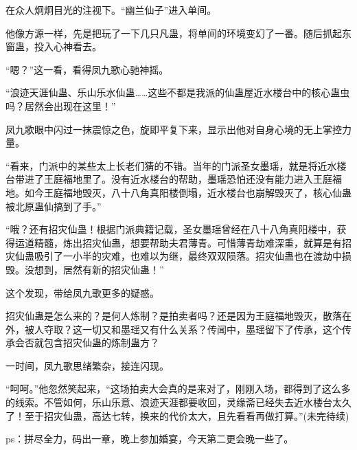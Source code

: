 \begin{this_body}
在众人炯炯目光的注视下。“幽兰仙子”进入单间。

他像方源一样，先是把玩了一下几只凡蛊，将单间的环境变幻了一番。随后抓起东窗蛊，投入心神看去。

“嗯？”这一看，看得凤九歌心驰神摇。

“浪迹天涯仙蛊、乐山乐水仙蛊……这些不都是我派的仙蛊屋近水楼台中的核心蛊虫吗？居然会出现在这里！”

凤九歌眼中闪过一抹震惊之色，旋即平复下来，显示出他对自身心境的无上掌控力量。

“看来，门派中的某些太上长老们猜的不错。当年的门派圣女墨瑶，就是将近水楼台带进了王庭福地里了。没有近水楼台的帮助，墨瑶恐怕还没有能力进入王庭福地。如今王庭福地毁灭，八十八角真阳楼倒塌，近水楼台也崩解毁灭了，核心仙蛊被北原蛊仙搞到了手。”

“哦？还有招灾仙蛊！根据门派典籍记载，圣女墨瑶曾经在八十八角真阳楼中，获得运道精髓，炼出招灾仙蛊，想要帮助夫君薄青。可惜薄青劫难深重，就算是有招灾仙蛊吸引了一小半的灾难，也难以为继，最终双双陨落。招灾仙蛊也在渡劫中损毁。没想到，居然有新的招灾仙蛊！”

这个发现，带给凤九歌更多的疑惑。

招灾仙蛊是怎么来的？是何人炼制？是拍卖者吗？还是因为王庭福地毁灭，散落在外，被人夺取？这一切又和墨瑶又有什么关系？传闻中，墨瑶留下了传承，这个传承会否就包含招灾仙蛊的炼制蛊方？

一时间，凤九歌思绪繁杂，接连闪现。

“呵呵。”他忽然笑起来，“这场拍卖大会真的是来对了，刚刚入场，都得到了这么多的线索。不管如何，乐山乐意、浪迹天涯都要收回，灵缘斋已经失去近水楼台太久了！至于招灾仙蛊，高达七转，换来的代价太大，且先看看再做打算。”(未完待续)

ps：拼尽全力，码出一章，晚上参加婚宴，今天第二更会晚一些了。

\end{this_body}


